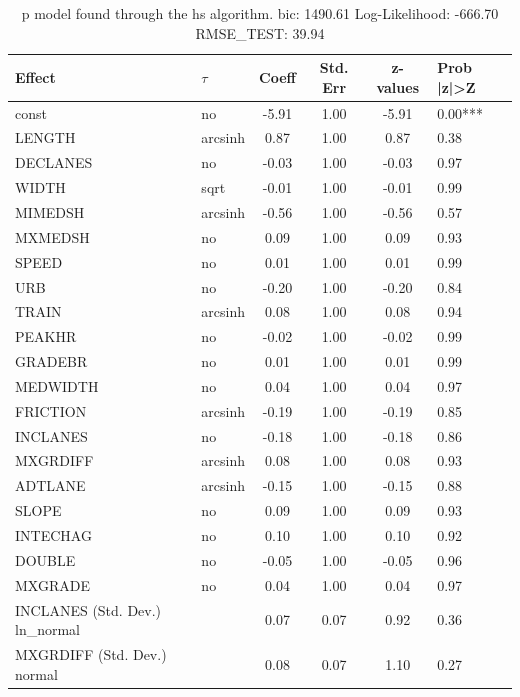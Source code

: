 \begin{table}
	\caption{p model found through the hs algorithm. bic: 1490.61 Log-Likelihood: -666.70 RMSE_TEST: 39.94}
	\begin{center}
		\begin{tabular}{|l|l|c|c|c|l|}
			\hline
			Effect & $\tau$ & Coeff & Std. Err & z-values & Prob |z|>Z \\
			\hline
			const & no & -5.91 & 1.00 & -5.91 & 0.00*** \\
			\hline
			LENGTH & arcsinh & 0.87 & 1.00 & 0.87 & 0.38 \\
			\hline
			DECLANES & no & -0.03 & 1.00 & -0.03 & 0.97 \\
			\hline
			WIDTH & sqrt & -0.01 & 1.00 & -0.01 & 0.99 \\
			\hline
			MIMEDSH & arcsinh & -0.56 & 1.00 & -0.56 & 0.57 \\
			\hline
			MXMEDSH & no & 0.09 & 1.00 & 0.09 & 0.93 \\
			\hline
			SPEED & no & 0.01 & 1.00 & 0.01 & 0.99 \\
			\hline
			URB & no & -0.20 & 1.00 & -0.20 & 0.84 \\
			\hline
			TRAIN & arcsinh & 0.08 & 1.00 & 0.08 & 0.94 \\
			\hline
			PEAKHR & no & -0.02 & 1.00 & -0.02 & 0.99 \\
			\hline
			GRADEBR & no & 0.01 & 1.00 & 0.01 & 0.99 \\
			\hline
			MEDWIDTH & no & 0.04 & 1.00 & 0.04 & 0.97 \\
			\hline
			FRICTION & arcsinh & -0.19 & 1.00 & -0.19 & 0.85 \\
			\hline
			INCLANES & no & -0.18 & 1.00 & -0.18 & 0.86 \\
			\hline
			MXGRDIFF & arcsinh & 0.08 & 1.00 & 0.08 & 0.93 \\
			\hline
			ADTLANE & arcsinh & -0.15 & 1.00 & -0.15 & 0.88 \\
			\hline
			SLOPE & no & 0.09 & 1.00 & 0.09 & 0.93 \\
			\hline
			INTECHAG & no & 0.10 & 1.00 & 0.10 & 0.92 \\
			\hline
			DOUBLE & no & -0.05 & 1.00 & -0.05 & 0.96 \\
			\hline
			MXGRADE & no & 0.04 & 1.00 & 0.04 & 0.97 \\
			\hline
			INCLANES (Std. Dev.) ln_normal &  & 0.07 & 0.07 & 0.92 & 0.36 \\
			\hline
			MXGRDIFF (Std. Dev.) normal &  & 0.08 & 0.07 & 1.10 & 0.27 \\

\end{tabular}
\end{center}
\end{table}
